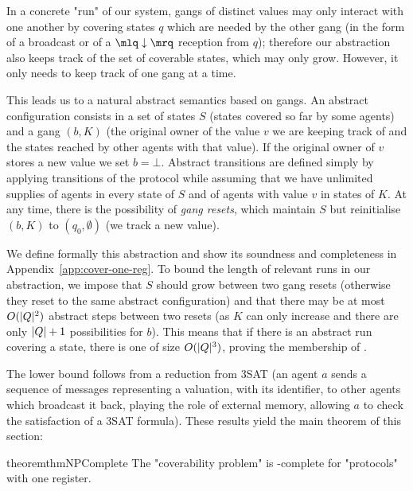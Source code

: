 %

In a concrete "run" of our system, gangs of distinct values may only interact with one another by covering states $q$ which are needed by the other gang (in the form of a broadcast or of a $\quotemarks{\enregact}$ reception from $q$); therefore our abstraction also keeps track of the set of coverable states, which may only grow. However, it only needs to keep track of one gang at a time.

This leads us to a natural abstract semantics based on gangs. An abstract configuration consists in a set of states $S$ (states covered so far by some agents) and a gang $(b, K)$ (the original owner of the value $v$ we are keeping track of and the states reached by other agents with that value). If the original owner of $v$ stores a new value we set $b = \bot$.
Abstract transitions are defined simply by applying transitions of the protocol while assuming that we have unlimited supplies of agents in every state of $S$ and of agents with value $v$ in states of $K$.
At any time, there is the possibility of \emph{gang resets}, which maintain $S$ but reinitialise $(b,K)$ to $(q_0, \emptyset)$ (we track a new value). 

We define formally this abstraction and show its soundness and completeness in Appendix~\ref{app:cover-one-reg}.
To bound the length of relevant runs in our abstraction, we impose that $S$ should grow between two gang resets (otherwise they reset to the same abstract configuration) and that there may be at most $O(|Q|^2)$ abstract steps between two resets (as $K$ can only increase and there are only $|Q|+1$ possibilities for $b$). This means that if there is an abstract run covering a state, there is one of size $O(|Q|^3)$, proving the \NP membership of \COVER. 

The \NP lower bound follows from a reduction from 3SAT (an agent $a$ sends a sequence of messages representing a valuation, with its identifier, to other agents which broadcast it back, playing the role of external memory, allowing $a$ to check the satisfaction of a 3SAT formula).
These results yield the main theorem of this section:


\begin{restatable}{theorem}{thmNPComplete}
	\label{thm:np-complete-query-cover}
	The "coverability problem" is \NP-complete for "protocols" with one register.
\end{restatable}

